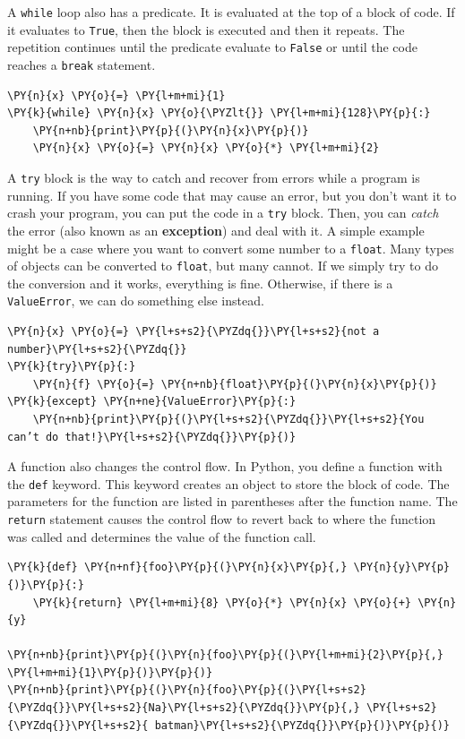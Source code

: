 A \texttt{while} loop also has a predicate.  It is evaluated at the top of a block of code.  If it evaluates to \texttt{True}, then the block is executed and then it repeats.  The repetition continues until the predicate evaluate to \texttt{False} or until the code reaches a \texttt{break} statement.

\begin{Verbatim}[commandchars=\\\{\}]
\PY{n}{x} \PY{o}{=} \PY{l+m+mi}{1}
\PY{k}{while} \PY{n}{x} \PY{o}{\PYZlt{}} \PY{l+m+mi}{128}\PY{p}{:}
    \PY{n+nb}{print}\PY{p}{(}\PY{n}{x}\PY{p}{)}
    \PY{n}{x} \PY{o}{=} \PY{n}{x} \PY{o}{*} \PY{l+m+mi}{2}
\end{Verbatim}



A \texttt{try} block is the way to catch and recover from errors while a program is running.  If you have some code that may cause an error, but you don’t want it to crash your program, you can put the code in a \texttt{try} block.  Then, you can \emph{catch} the error (also known as an \textbf{exception}) and deal with it.  A simple example might be a case where you want to convert some number to a \texttt{float}.  Many types of objects can be converted to \texttt{float}, but many cannot.  If we simply try to do the conversion and it works, everything is fine.  Otherwise, if there is a \texttt{ValueError}, we can do something else instead.  

\begin{Verbatim}[commandchars=\\\{\}]
\PY{n}{x} \PY{o}{=} \PY{l+s+s2}{\PYZdq{}}\PY{l+s+s2}{not a number}\PY{l+s+s2}{\PYZdq{}}
\PY{k}{try}\PY{p}{:}
    \PY{n}{f} \PY{o}{=} \PY{n+nb}{float}\PY{p}{(}\PY{n}{x}\PY{p}{)}
\PY{k}{except} \PY{n+ne}{ValueError}\PY{p}{:}
    \PY{n+nb}{print}\PY{p}{(}\PY{l+s+s2}{\PYZdq{}}\PY{l+s+s2}{You can’t do that!}\PY{l+s+s2}{\PYZdq{}}\PY{p}{)}
\end{Verbatim}



A function also changes the control flow.  In Python, you define a function with the \texttt{def} keyword.  This keyword creates an object to store the block of code.  The parameters for the function are listed in parentheses after the function name.  The \texttt{return} statement causes the control flow to revert back to where the function was called and determines the value of the function call.  

\begin{Verbatim}[commandchars=\\\{\}]
\PY{k}{def} \PY{n+nf}{foo}\PY{p}{(}\PY{n}{x}\PY{p}{,} \PY{n}{y}\PY{p}{)}\PY{p}{:}
    \PY{k}{return} \PY{l+m+mi}{8} \PY{o}{*} \PY{n}{x} \PY{o}{+} \PY{n}{y}

\PY{n+nb}{print}\PY{p}{(}\PY{n}{foo}\PY{p}{(}\PY{l+m+mi}{2}\PY{p}{,} \PY{l+m+mi}{1}\PY{p}{)}\PY{p}{)}
\PY{n+nb}{print}\PY{p}{(}\PY{n}{foo}\PY{p}{(}\PY{l+s+s2}{\PYZdq{}}\PY{l+s+s2}{Na}\PY{l+s+s2}{\PYZdq{}}\PY{p}{,} \PY{l+s+s2}{\PYZdq{}}\PY{l+s+s2}{ batman}\PY{l+s+s2}{\PYZdq{}}\PY{p}{)}\PY{p}{)}
\end{Verbatim}



